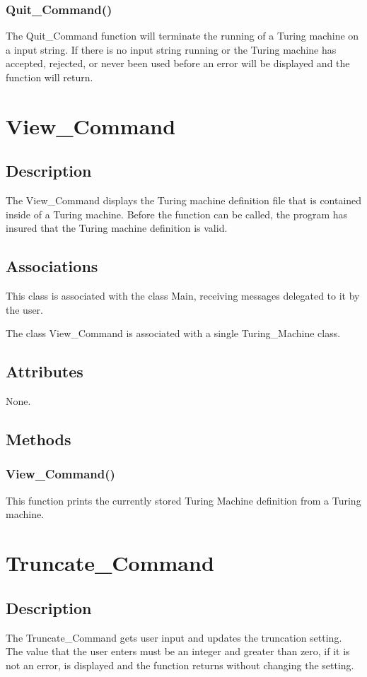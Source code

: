 \documentclass{report}
\begin{document}
    \subsubsection{Quit\_Command()}
    The Quit\_Command function will terminate the running of a Turing machine on a input string. If there is no input string running or the Turing machine has accepted, rejected, or never been used before an error will be displayed and the function will return.
    
    
    
\section{View\_Command}
	\subsection{Description}
    The View\_Command displays the Turing machine definition file that is contained inside of a Turing machine. Before the function can be called, the program has insured that the Turing machine definition is valid.
    
    \subsection{Associations} 
    This class is associated with the class Main, receiving messages delegated to it by the user.
    
    The class View\_Command is associated with a single Turing\_Machine class.
    
    \subsection{Attributes}
    None.
    \subsection{Methods} 
    \subsubsection{View\_Command()}
    This function prints the currently stored Turing Machine definition from a Turing machine.    
    
    
\section{Truncate\_Command}
	\subsection{Description}
    The Truncate\_Command gets user input and updates the truncation setting. The value that the user enters must be an integer and greater than zero, if it is not an error, is displayed and the function returns without changing the setting. 
\end{document}
